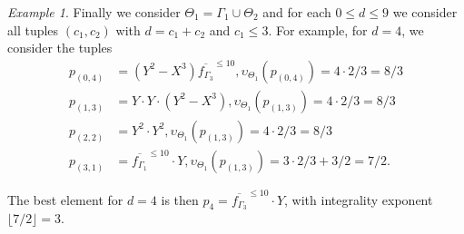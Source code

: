 \documentclass[a4paper,11pt]{amsart}%
\theoremstyle{definition}
\theoremstyle{plain}
\theoremstyle{remark}
\newtheorem{example}[defn]{Example}
\DeclareMathOperator{\TruncatedFactor}{\mathtt{IntegralBasisElement}}
\begin{document}
\begin{example}
Finally we consider $\Theta_1 = \Gamma_1 \cup \Theta_2$ and for each $0 \le d \le 9$ we consider all tuples $(c_1, c_2)$ with $d = c_1 + c_2$ and $c_1 \le 3$. For example, for $d = 4$, we consider the tuples
$$
\begin{aligned}
p_{(0,4)} &= (Y^2-X^3)\overline{f_{\Gamma_3}}^{\le 10}, \upsilon_{\Theta_1}(p_{(0,4)}) = 4 \cdot 2/3 = 8/3 \\
p_{(1,3)} &= Y\cdot Y\cdot(Y^2-X^3), \upsilon_{\Theta_1}(p_{(1,3)}) = 4 \cdot 2/3 = 8/3 \\
p_{(2,2)} &= Y^2\cdot Y^2, \upsilon_{\Theta_1}(p_{(1,3)}) = 4 \cdot 2/3 = 8/3 \\
p_{(3,1)} &= \overline{f_{\Gamma_1}}^{\le 10} \cdot Y, \upsilon_{\Theta_1}(p_{(1,3)}) = 3 \cdot 2/3 + 3/2 =  7/2.
\end{aligned}
$$

The best element for $d= 4$ is then $p_4 = \overline{f_{\Gamma_3}}^{\le 10} \cdot Y$, with integrality exponent $\lfloor 7/2 \rfloor = 3$.
\end{example}




%
\end{document}
